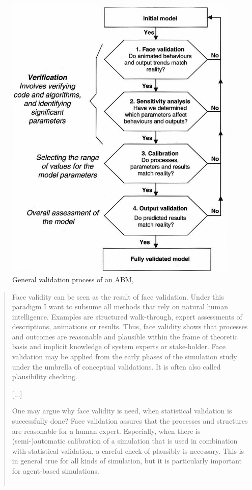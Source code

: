 \begin{figure}[H]
	\includegraphics[width=.6\linewidth]{img/Schema_Ngo.png}
	\caption{\og General validation process of an ABM\fg{}, \cite[fig. 10.1 p. 183]{ngo_calibration_2012}}
	\label{fig:schema_ngo}
\end{figure}


\begin{quotation}
\og Face validity can be seen as the result of face validation. Under this paradigm I want to subsume all methods that rely on natural human intelligence. Examples are structured walk-through, expert assessments of descriptions, animations or results. Thus, face validity shows that processes and outcomes are reasonable and plausible within the frame of theoretic basis and implicit knowledge of system experts or stake-holder. Face validation may be applied from the early phases of the simulation study under the umbrella of conceptual validations. It is often also called plausibility checking.

[...]

One may argue why face validity is need, when statistical validation is successfully done? Face validation assures that the processes and structures are reasonable for a human expert. Especially, when there is (semi-)automatic calibration of a simulation that is used in combination with statistical validation, a careful check of plausibly is necessary. This is in general true for all kinds of simulation, but it is particularly important for agent-based simulations.\fg{}\\
\mbox{}~ \hfill \cite[39-40]{klugl_validation_2008}
	\end{quotation}

